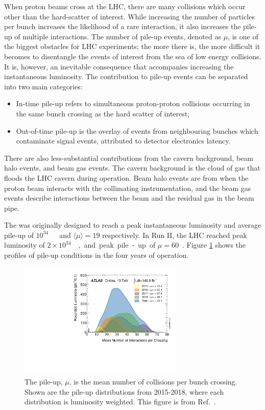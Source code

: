 When proton beams cross at the LHC, there are many collisions which occur other than the hard-scatter of interest. While increasing the number of particles per bunch increases the likelihood of a rare interaction, it also increases the pile-up of multiple interactions. The number of pile-up events, denoted as $\mu$, is one of the biggest obstacles for LHC experiments; the more there is, the more difficult it becomes to disentangle the events of interest from the sea of low energy collisions. It is, however, an inevitable consequence that accompanies increasing the instantaneous luminosity. The contribution to pile-up events can be separated into two main categories: 
\begin{itemize}
  \item In-time pile-up refers to simultaneous proton-proton collisions occurring in the same bunch crossing as the hard scatter of interest;
  \item Out-of-time pile-up is the overlay of events from neighbouring bunches which contaminate signal events, attributed to detector electronics latency.
\end{itemize}
There are also less-substantial contributions from the cavern background, beam halo events, and beam gas events. The cavern background is the cloud of gas that floods the LHC cavern during operation. Beam halo events are from when the proton beam interacts with the collimating instrumentation, and the beam gas events describe interactions between the beam and the residual gas in the beam pipe. 

The \LHC was originally designed to reach a peak instantaneous luminosity and average pile-up of \unit{$10^{34}$}{\rpsquare{\cm}\reciprocal{\second}} and $\langle\mu\rangle=19$ respectively. In Run II, the LHC reached peak luminosity of $2\times$\unit{$10^{34}$}{\rpsquare{\cm}\reciprocal{\second}}, and peak pile-up of $\mu=60$~\cite{boyd2020lhc}. Figure \ref{fig:Pileup} shows the profiles of pile-up conditions in the four years of operation. 

\begin{figure}
  \includegraphics[width=0.7\textwidth]{Figures/LHC/PileUp_2015_2018.pdf}
  \caption[Pile-up distributions.]
  {The pile-up, $\mu$, is the mean number of collisions per bunch crossing. Shown are the pile-up distributions from 2015-2018, where each distribution is luminosity weighted. This figure is from Ref.~\cite{pileupatlas}.}
  \label{fig:Pileup}
\end{figure}


